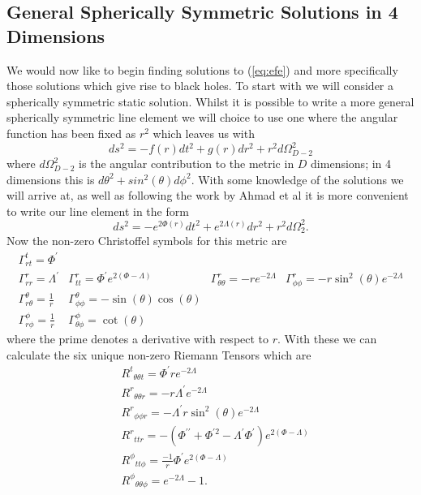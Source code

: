 \documentclass[12pt]{article}
\numberwithin{equation}{section}
\numberwithin{figure}{section}
\begin{document}
\subsection{General Spherically Symmetric Solutions in 4 Dimensions} %
\label{sub:general_spherically_symmetric_solutions}
We would now like to begin finding solutions to (\ref{eq:efe}) and more specifically those solutions which give rise to black holes. To start with we will consider a spherically symmetric static solution. Whilst it is possible to write a more general spherically symmetric line element we will choice to use one where the angular function has been fixed as $r^{2}$ which leaves us with
\begin{equation}
	ds^2= -f(r)dt^2 + g(r)dr^2+r^2 d{\Omega}^2_{D-2}
\end{equation}
where $d{\Omega}^2_{D-2}$ is the angular contribution to the metric in $D$ dimensions; in 4 dimensions this is $d\theta^2+sin^2(\theta)d\phi^2$. With some knowledge of the solutions we will arrive at, as well as following the work by Ahmad et al\cite{Ahmad:2013tia} it is more convenient to write our line element in the form
\begin{equation}
	ds^2= -e^{2\Phi(r)}dt^2 + e^{2\Lambda(r)}dr^2 + r^2 d{\Omega}^2_{2} \label{eq:sch-met-func-4d}.
\end{equation}
Now the non-zero Christoffel symbols for this metric are
\renewcommand{\arraystretch}{2}
\begin{equation}
	\begin{array}{llll}
		\Gamma^{t}_{rt}=\Phi^\prime & & & \\
		\Gamma^{r}_{rr}=\Lambda^\prime &\Gamma^{r}_{tt}=\Phi^\prime e^{2(\Phi-\Lambda)} &\Gamma^{r}_{\theta\theta}=-re^{-2\Lambda} &\Gamma^{r}_{\phi\phi}=-r\sin^2(\theta) e^{-2\Lambda} \\
		\Gamma^{\theta}_{r\theta}=\frac{1}{r} 	&\Gamma^{\theta}_{\phi\phi}=-\sin(\theta)\cos(\theta) & &\\
		\Gamma^{\phi}_{r\phi}=\frac{1}{r} &\Gamma^{\phi}_{\theta\phi}=\cot(\theta) & &
	\end{array}
\end{equation}
where the prime denotes a derivative with respect to $r$. With these we can calculate the six unique non-zero Riemann Tensors which are\renewcommand{\arraystretch}{1}
\begin{align}
&{R^t}_{\theta\theta t}=\Phi^\prime r e^{-2\Lambda}\nonumber \\ 
&{R^r}_{\theta\theta r}= -r \Lambda^\prime e^{-2\Lambda}\nonumber\\ 
&{R^r}_{\phi\phi r}= -\Lambda^\prime r \sin^2(\theta) e^{-2\Lambda}\nonumber\\
&{R^r}_{ttr}= -(\Phi^{\prime\prime}+\Phi^{\prime 2} -\Lambda^\prime\Phi^\prime)e^{2(\Phi-\Lambda)}\nonumber\\
&{R^\phi}_{tt\phi}= \frac{-1}{r}\Phi^\prime e^{2(\Phi-\Lambda)}\nonumber\\
&{R^\phi}_{\theta\theta\phi}= e^{-2 \Lambda} -1.
\end{align}
\end{document}
